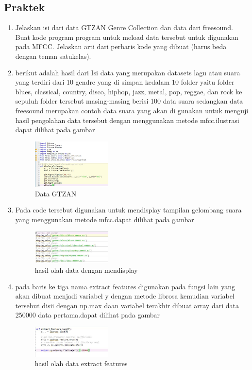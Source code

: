     \subsection{Praktek}
        \begin{enumerate}
        \item Jelaskan isi dari data GTZAN Genre Collection dan data dari freesound. Buat kode program program untuk meload data tersebut untuk digunakan pada MFCC. Jelaskan arti dari perbaris kode yang dibuat (harus beda dengan teman satukelas).

        \item berikut adalah hasil dari Isi data yang merupakan datasets lagu atau suara yang terdiri dari 10 gendre yang di simpan kedalam 10 folder yaitu folder blues, classical, country, disco, hiphop, jazz, metal, pop, reggae, dan rock ke sepuluh folder tersebut masing-masing  berisi 100 data suara sedangkan data freesound merupakan contoh data suara yang akan di gunakan untuk menguji hasil pengolahan data tersebut dengan menggunakan metode mfcc.ilustrasi dapat dilihat pada gambar
        \begin{figure}[H]
            \includegraphics[width=4cm]{figures/1174039/chapter6/1.jpg}
            \centering
            \caption{Data GTZAN}
        \end{figure}
        
        \item Pada code tersebut digunakan untuk mendisplay tampilan gelombang suara yang menggunakan metode mfcc.dapat dilihat pada gambar
        \begin{figure}[H]
            \includegraphics[width=4cm]{figures/1174039/chapter6/2.jpg}
            \centering
            \caption{hasil olah data dengan mendisplay}
        \end{figure}
        
        \item pada baris ke tiga nama extract features digunakan pada fungsi lain yang akan dibuat menjadi variabel y dengan metode librosa kemudian variabel tersebut disii dengan np.max daan variabel terakhir dibuat array dari data 250000 data pertama.dapat dilihat pada gambar
        \begin{figure}[H]
            \includegraphics[width=4cm]{figures/1174039/chapter6/3.jpg}
            \centering
            \caption{hasil olah data extract features}
        \end{figure}
        

\end{enumerate}
